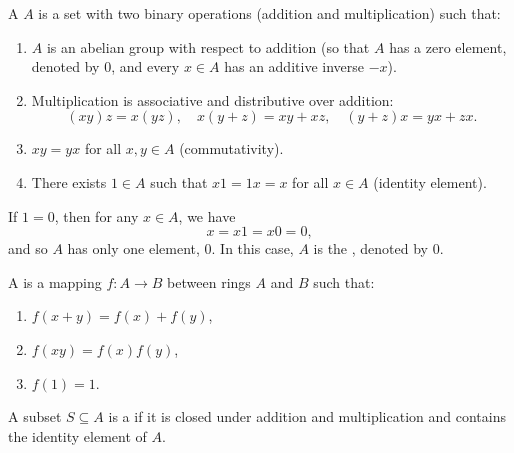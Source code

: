\begin{definition}[Ring]
    A  \( A \) is a set with two binary operations (addition and multiplication) such that:
    \begin{enumerate}
        \item \( A \) is an abelian group with respect to addition (so that \( A \) has a zero element, denoted by \( 0 \), and every \( x \in A \) has an additive inverse \( -x \)).
        \item Multiplication is associative and distributive over addition:
        \[
        (xy)z = x(yz), \quad x(y + z) = xy + xz, \quad (y + z)x = yx + zx.
        \]
        \item \( xy = yx \) for all \( x, y \in A \) (commutativity).
        \item There exists \( 1 \in A \) such that \( x1 = 1x = x \) for all \( x \in A \) (identity element).
    \end{enumerate}
\end{definition}
    
\begin{remark}
If \( 1 = 0 \), then for any \( x \in A \), we have
\[
x = x1 = x0 = 0,
\]
and so \( A \) has only one element, \( 0 \). In this case, \( A \) is the , denoted by \( 0 \).
\end{remark}
    
\begin{definition}
A  is a mapping \( f: A \to B \) between rings \( A \) and \( B \) such that:
\begin{enumerate}
    \item \( f(x + y) = f(x) + f(y) \),
    \item \( f(xy) = f(x)f(y) \),
    \item \( f(1) = 1 \).
\end{enumerate}
\end{definition}

\begin{definition}[Subring] A subset \( S \subseteq A \) is a
 if it is closed under addition and multiplication and
contains the identity element of \( A \). \end{definition}
    

